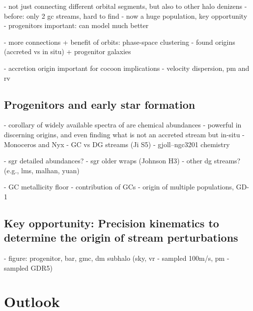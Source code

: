 \documentclass[final,5p,times,twocolumn,authoryear]{elsarticle}
\begin{document}
- not just connecting different orbital segments, but also to other halo denizens
- before: only 2 gc streams, hard to find \citep{balbinot}
- now a huge population, key opportunity
- progenitors important: can model much better \citep{kupper:2015}


- more connections + benefit of orbits: phase-space clustering \citep{bonaca:2021}
- found origins (accreted vs in situ) + progenitor galaxies

- accretion origin important for cocoon implications
- velocity dispersion, pm and rv


\subsection{Progenitors and early star formation}
- corollary of widely available spectra of are chemical abundances
- powerful in discerning origins, and even finding what is not an accreted stream but in-situ
- Monoceros and Nyx
- GC vs DG streams (Ji S5)
- gjoll--ngc3201 chemistry \citep{hansen:2020}

- sgr detailed abundances?
- sgr older wraps (Johnson H3)
- other dg streams? (e.g., lms, malhan, yuan)

- GC metallicity floor
- contribution of GCs
- origin of multiple populations, GD-1


\subsection{Key opportunity: Precision kinematics to determine the origin of stream perturbations}
- figure: progenitor, bar, gmc, dm subhalo (sky, vr - sampled 100m/s, pm - sampled GDR5)



\section{Outlook}
\label{sec:outlook}

\end{document}
